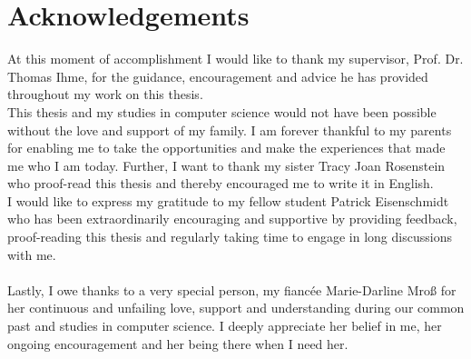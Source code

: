\chapter*{Acknowledgements}
At this moment of accomplishment I would like to thank my supervisor, Prof. Dr. Thomas Ihme, for the guidance, encouragement and advice he has provided throughout my work on this thesis.\\
This thesis and my studies in computer science would not have been possible without the love and support of my family. I am forever thankful to my parents for enabling me to take the opportunities and make the experiences that made me who I am today. Further, I want to thank my sister Tracy Joan Rosenstein who proof-read this thesis and thereby encouraged me to write it in English.\\
I would like to express my gratitude to my fellow student Patrick Eisenschmidt who has been extraordinarily encouraging and supportive by providing feedback, proof-reading this thesis and regularly taking time to engage in long discussions with me.\\ \\
Lastly, I owe thanks to a very special person, my fiancée Marie-Darline Mroß for her continuous and unfailing love, support and understanding during our common past and studies in computer science. I deeply appreciate her belief in me, her ongoing encouragement and her being there when I need her.